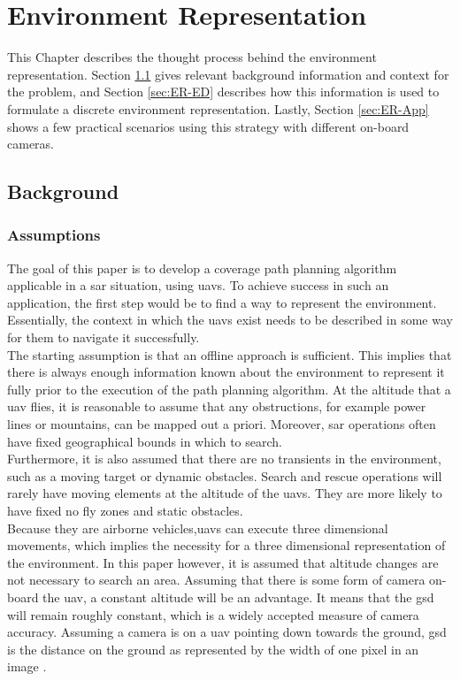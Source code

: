 \chapter{Environment Representation}
\label{chp:ER}
This Chapter describes the thought process behind the environment representation. Section \ref{sec:ER-bg} gives relevant background information and context for the problem, and Section \ref{sec:ER-ED} describes how this information is used to formulate a discrete environment representation. Lastly, Section \ref{sec:ER-App} shows a few practical scenarios using this strategy with different on-board cameras. 

\section{Background}
\label{sec:ER-bg}
\subsection{Assumptions}
The goal of this paper is to develop a coverage path planning algorithm \hbox{applicable} in a \acl{sar} situation, using \acsp{uav}. To achieve success in such an application, the first step would be to find a way to represent the environment. Essentially, the context in which the \acsp{uav} exist needs to be described in some way for them to navigate it successfully.\\ 
The starting assumption is that an offline approach is sufficient. This implies that there is always enough information known about the environment to represent it fully prior to the execution of the path planning algorithm. At the altitude that a \acs{uav} flies, it is reasonable to assume that any obstructions, for example power lines or mountains, can be mapped out a priori. Moreover, \acs{sar} operations often have fixed geographical bounds in which to search. \\
Furthermore, it is also assumed that there are no transients in the environment, such as a moving target or dynamic obstacles. Search and rescue operations will rarely have moving elements at the altitude of the \acsp{uav}. They are more likely to have fixed no fly zones and static obstacles.\\
Because they are airborne vehicles,\acsp{uav} can execute three dimensional movements, which implies the necessity for a three dimensional representation of the environment. In this paper however, it is assumed that altitude changes are not necessary to search an area. Assuming that there is some form of camera on-board the \acs{uav}, a constant altitude will be an advantage. It means that the \acf{gsd} will remain roughly constant, which is a widely accepted measure of camera accuracy. Assuming a camera is on a \acs{uav} pointing down towards the ground, \acs{gsd} is the distance on the ground as represented by the width of one pixel in an image \cite{PropellerAero2021}.\\
